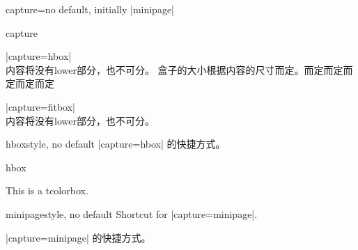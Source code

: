 \begin{docTcbKey}{capture}{=}{no default, initially |minipage|}
\begin{exdispExample}{capture}
\begin{tcolorbox}[capture=hbox]
|capture=hbox|\\
内容将没有lower部分，也不可分。%
盒子的大小根据内容的尺寸而定。而定而定而定而定而定%
\end{tcolorbox}

\begin{tcolorbox}[capture=fitbox,height=9mm]%
|capture=fitbox|\\
内容将没有lower部分，也不可分。
\end{tcolorbox}
\end{exdispExample}
\end{docTcbKey}




\begin{docTcbKey}{hbox}{}{style, no default}
|capture=hbox| 的快捷方式。
\begin{exdispExample}{hbox}

\begin{tcolorbox}[hbox]
This is a tcolorbox.
\end{tcolorbox}
\end{exdispExample}
\end{docTcbKey}


\begin{docTcbKey}{minipage}{}{style, no default}
  Shortcut for |capture=minipage|.

  |capture=minipage| 的快捷方式。
\end{docTcbKey}




